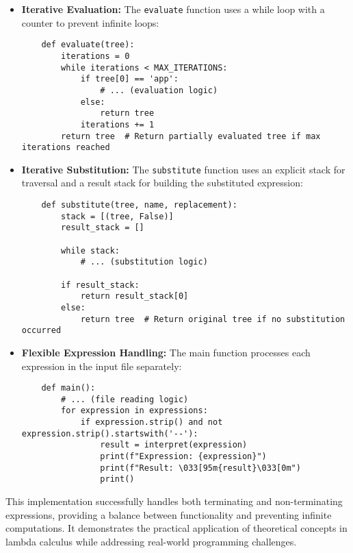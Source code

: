\documentclass{article}
\theoremstyle{theorem}
\theoremstyle{definition}
\theoremstyle{remark}
\begin{document}
\begin{itemize}
    \item \textbf{Iterative Evaluation:} The \texttt{evaluate} function uses a while loop with a counter to prevent infinite loops:
    
    \begin{verbatim}
    def evaluate(tree):
        iterations = 0
        while iterations < MAX_ITERATIONS:
            if tree[0] == 'app':
                # ... (evaluation logic)
            else:
                return tree
            iterations += 1
        return tree  # Return partially evaluated tree if max iterations reached
    \end{verbatim}
    
    \item \textbf{Iterative Substitution:} The \texttt{substitute} function uses an explicit stack for traversal and a result stack for building the substituted expression:
    
    \begin{verbatim}
    def substitute(tree, name, replacement):
        stack = [(tree, False)]
        result_stack = []
        
        while stack:
            # ... (substitution logic)
        
        if result_stack:
            return result_stack[0]
        else:
            return tree  # Return original tree if no substitution occurred
    \end{verbatim}
    
    \item \textbf{Flexible Expression Handling:} The main function processes each expression in the input file separately:
    
    \begin{verbatim}
    def main():
        # ... (file reading logic)
        for expression in expressions:
            if expression.strip() and not expression.strip().startswith('--'):
                result = interpret(expression)
                print(f"Expression: {expression}")
                print(f"Result: \033[95m{result}\033[0m")
                print()
    \end{verbatim}
\end{itemize}

This implementation successfully handles both terminating and non-terminating expressions, providing a balance between functionality and preventing infinite computations. It demonstrates the practical application of theoretical concepts in lambda calculus while addressing real-world programming challenges.
\end{document}
